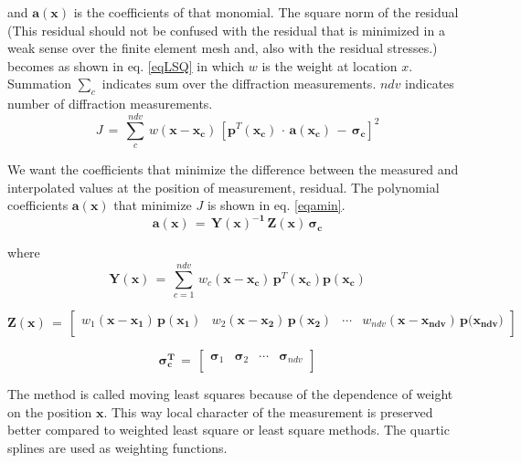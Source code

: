 \documentclass{article}
\begin{document}
and $\mathbf{a}(\mathbf{x})$ is the coefficients of that monomial. The square norm of the residual (This residual should not be confused with the residual that is minimized in a weak sense over the finite element mesh and, also with the residual stresses.) becomes as shown in eq. \eqref{eqLSQ} in which $w$ is the weight at location $x$. Summation $\sum_c$ indicates sum over the diffraction measurements. $ndv$ indicates number of diffraction measurements.
\begin{equation}
J\,= \, \sum_c^{ndv} \,w(\mathbf{x}-\mathbf{x_{c}})\,[\mathbf{p}^T(\mathbf{x_c}) \,\cdot\,\mathbf{a}(\mathbf{x_c}) \,-\, \mathbf{\sigma_c}]^2
\label{eqLSQ}
\end{equation}

We want the coefficients that minimize the difference between the measured and interpolated values at the position of measurement, residual. The polynomial coefficients $\mathbf{a}(\mathbf{x}) $ that minimize $J$ is shown in eq. \eqref{eqamin}.
\begin{equation}
\mathbf{a}(\mathbf{x}) \,=\, \mathbf{Y(\mathbf{x})^{-1}} \, \mathbf{Z(\mathbf{x})} \, \mathbf{\sigma_c}
\label{eqamin}
\end{equation}

where
\begin{equation}
\mathbf{Y(\mathbf{x})} \,=\, \sum_{c=1}^{ndv} \, w_c(\mathbf{x}-\mathbf{x_{c}})\, \mathbf{p}^T(\mathbf{x_c})\mathbf{p}(\mathbf{x_c})
\end{equation}

\begin{equation}
\mathbf{Z(\mathbf{x})} \,=\, 
\left[{ \begin{array}{cccccc}
		w_1(\mathbf{x}-\mathbf{x_{1}})\,\mathbf{p(x_1)} & w_2(\mathbf{x}-\mathbf{x_{2}})\,\mathbf{p(x_2)} & \cdots & w_{ndv}(\mathbf{x}-\mathbf{x_{ndv}})\,\mathbf{p(x_{ndv}}) \\
\end{array}} \right]
\end{equation}
 
\begin{equation}
\mathbf{\sigma_c^T} \,=\, \left[{ \begin{array}{cccccc}
		\mathbf{\sigma}_1 & \mathbf{\sigma}_2 & \cdots & \mathbf{\sigma}_{ndv} \\
\end{array}} \right]
\end{equation} 
 
The method is called moving least squares because of the dependence of weight on the position $\mathbf{x}$. This way local character of the measurement is preserved better compared to weighted least square or least square methods. The quartic splines are used as weighting functions.
\end{document}
